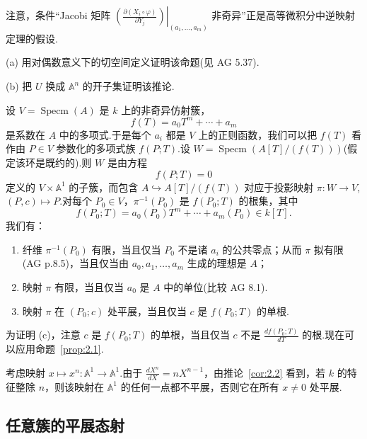 \begin{remark}\label{rem:2.3}
注意，条件``Jacobi 矩阵 $\left.\left(\frac{\partial (X_i \circ \varphi)}{\partial Y_j}\right)\right|_{(a_1, \ldots, a_m)}$ 非奇异''正是高等微积分中逆映射定理的假设.
\end{remark}

\begin{exercise}\label{exc:2.4}
(a) 用对偶数意义下的切空间定义证明该命题(见 AG 5.37).

(b) 把 $U$ 换成 $\mathbb{A}^{n}$ 的开子集证明该推论.
\end{exercise}

\begin{example}\label{ex:2.5}
设 $V = \operatorname{Specm}(A)$ 是 $k$ 上的非奇异仿射簇，
\[
f(T) = a_0 T^{m} + \cdots + a_m
\]
是系数在 $A$ 中的多项式.于是每个 $a_i$ 都是 $V$ 上的正则函数，我们可以把 $f(T)$ 看作由 $P \in V$ 参数化的多项式族 $f(P; T)$.设 $W = \operatorname{Specm}(A[T]/(f(T)))$(假定该环是既约的).则 $W$ 是由方程
\[
f(P; T) = 0
\]
定义的 $V \times \mathbb{A}^{1}$ 的子簇，而包含 $A \hookrightarrow A[T]/(f(T))$ 对应于投影映射 $\pi \colon W \to V$, $(P, c) \mapsto P$.对每个 $P_0 \in V$，$\pi^{-1}(P_0)$ 是 $f(P_0; T)$ 的根集，其中
\[
f(P_0; T) = a_0(P_0) T^{m} + \cdots + a_m(P_0) \in k[T].
\]
我们有：
\begin{enumerate}
  \item 纤维 $\pi^{-1}(P_0)$ 有限，当且仅当 $P_0$ 不是诸 $a_i$ 的公共零点；从而 $\pi$ 拟有限(AG p.8.5)，当且仅当由 $a_0, a_1, \ldots, a_m$ 生成的理想是 $A$；
  \item 映射 $\pi$ 有限，当且仅当 $a_0$ 是 $A$ 中的单位(比较 AG 8.1).
  \item 映射 $\pi$ 在 $(P_0; c)$ 处平展，当且仅当 $c$ 是 $f(P_0; T)$ 的单根.
\end{enumerate}
为证明 (c)，注意 $c$ 是 $f(P_0; T)$ 的单根，当且仅当 $c$ 不是 $\frac{df(P_0; T)}{dT}$ 的根.现在可以应用命题~\ref{prop:2.1}.
\end{example}

\begin{example}\label{ex:2.6}
考虑映射 $x \mapsto x^{n} \colon \mathbb{A}^{1} \to \mathbb{A}^{1}$.由于 $\frac{dX^{n}}{dX} = nX^{n-1}$，由推论~\ref{cor:2.2} 看到，若 $k$ 的特征整除 $n$，则该映射在 $\mathbb{A}^{1}$ 的任何一点都不平展，否则它在所有 $x \neq 0$ 处平展.
\end{example}

\subsection*{任意簇的平展态射}

